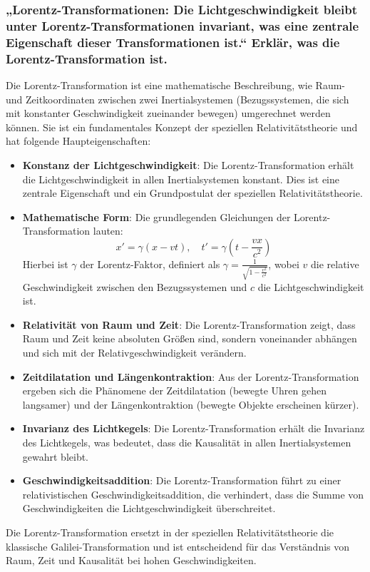 \documentclass[a4paper,12pt]{article}
\begin{document}
	\subsubsection{„Lorentz-Transformationen: Die Lichtgeschwindigkeit bleibt unter Lorentz-Transformationen invariant, was eine zentrale Eigenschaft dieser Transformationen ist.“ Erklär, was die Lorentz-Transformation ist.}
	Die Lorentz-Transformation ist eine mathematische Beschreibung, wie Raum- und Zeitkoordinaten zwischen zwei Inertialsystemen (Bezugssystemen, die sich mit konstanter Geschwindigkeit zueinander bewegen) umgerechnet werden können. Sie ist ein fundamentales Konzept der speziellen Relativitätstheorie und hat folgende Haupteigenschaften:
	\begin{itemize}
		\item \textbf{Konstanz der Lichtgeschwindigkeit}: Die Lorentz-Transformation erhält die Lichtgeschwindigkeit in allen Inertialsystemen konstant. Dies ist eine zentrale Eigenschaft und ein Grundpostulat der speziellen Relativitätstheorie.
		\item \textbf{Mathematische Form}: Die grundlegenden Gleichungen der Lorentz-Transformation lauten:
		\[
		x' = \gamma (x - vt), \quad t' = \gamma \left(t - \frac{vx}{c^2}\right)
		\]
		Hierbei ist \( \gamma \) der Lorentz-Faktor, definiert als \( \gamma = \frac{1}{\sqrt{1 - \frac{v^2}{c^2}}} \), wobei \( v \) die relative Geschwindigkeit zwischen den Bezugssystemen und \( c \) die Lichtgeschwindigkeit ist.
		\item \textbf{Relativität von Raum und Zeit}: Die Lorentz-Transformation zeigt, dass Raum und Zeit keine absoluten Größen sind, sondern voneinander abhängen und sich mit der Relativgeschwindigkeit verändern.
		\item \textbf{Zeitdilatation und Längenkontraktion}: Aus der Lorentz-Transformation ergeben sich die Phänomene der Zeitdilatation (bewegte Uhren gehen langsamer) und der Längenkontraktion (bewegte Objekte erscheinen kürzer).
		\item \textbf{Invarianz des Lichtkegels}: Die Lorentz-Transformation erhält die Invarianz des Lichtkegels, was bedeutet, dass die Kausalität in allen Inertialsystemen gewahrt bleibt.
		\item \textbf{Geschwindigkeitsaddition}: Die Lorentz-Transformation führt zu einer relativistischen Geschwindigkeitsaddition, die verhindert, dass die Summe von Geschwindigkeiten die Lichtgeschwindigkeit überschreitet.
	\end{itemize}
	Die Lorentz-Transformation ersetzt in der speziellen Relativitätstheorie die klassische Galilei-Transformation und ist entscheidend für das Verständnis von Raum, Zeit und Kausalität bei hohen Geschwindigkeiten.
	
\end{document}
